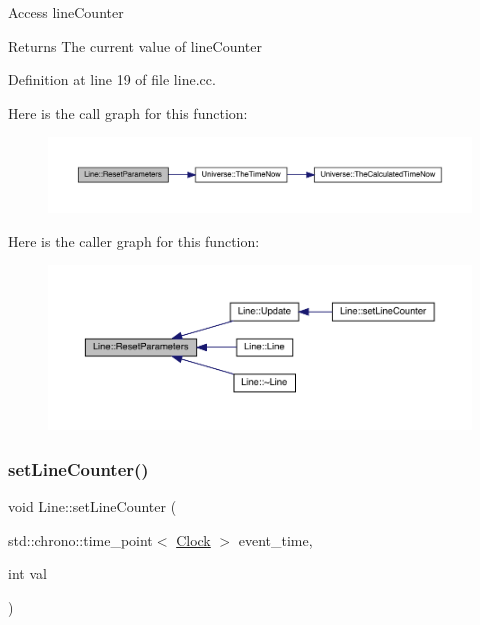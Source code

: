 Access line\+Counter \begin{DoxyReturn}{Returns}
The current value of line\+Counter 
\end{DoxyReturn}


Definition at line 19 of file line.\+cc.

Here is the call graph for this function\+:\nopagebreak
\begin{figure}[H]
\begin{center}
\leavevmode
\includegraphics[width=350pt]{class_line_af1756d1500ab0a5616313be6e213015a_cgraph}
\end{center}
\end{figure}
Here is the caller graph for this function\+:
\nopagebreak
\begin{figure}[H]
\begin{center}
\leavevmode
\includegraphics[width=350pt]{class_line_af1756d1500ab0a5616313be6e213015a_icgraph}
\end{center}
\end{figure}
\mbox{\label{class_line_ab98abcf3c8546e266ae5bbea243d8b8d}} 
\subsubsection{\texorpdfstring{set\+Line\+Counter()}{setLineCounter()}}
{\footnotesize\ttfamily void Line\+::set\+Line\+Counter (\begin{DoxyParamCaption}\item[{std\+::chrono\+::time\+\_\+point$<$ \hyperlink{universe_8h_a0ef8d951d1ca5ab3cfaf7ab4c7a6fd80}{Clock} $>$}]{event\+\_\+time,  }\item[{int}]{val }\end{DoxyParamCaption})\hspace{0.3cm}{\ttfamily [inline]}}



